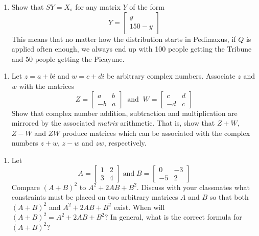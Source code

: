 \begin{enumerate}
\item \label{MClast} Show that $SY = X_{s}$ for any matrix $Y$ of the form \[Y = \left[ \begin{array}{r} y \\ 150 - y \end{array} \right]\] This means that no matter how the distribution starts in Pedimaxus, if $Q$ is applied often enough, we always end up with 100 people getting the Tribune and 50 people getting the Picayune.

\setcounter{HW}{\value{enumi}}
\end{enumerate}

\begin{enumerate}
\setcounter{enumi}{\value{HW}}

\item Let $z = a + bi$ and $w = c + di$ be arbitrary complex numbers.  Associate $z$ and $w$ with the matrices \[Z = \left[ \begin{array}{rr} a & b \\ -b & a \end{array} \right] \;\; \mbox{and} \;\; W = \left[ \begin{array}{rr} c & d \\ -d & c \end{array} \right]\]  Show that complex number addition, subtraction and multiplication are mirrored by the associated \emph{matrix} arithmetic.  That is, show that $Z + W$, $Z - W$ and $ZW$ produce matrices which can be associated with the complex numbers $z + w$, $z - w$ and $zw$, respectively.

\setcounter{HW}{\value{enumi}}
\end{enumerate}

\begin{enumerate}
\setcounter{enumi}{\value{HW}}

\item Let \[A = \left[ \begin{array}{rr} 1 & 2 \\ 3 & 4 \end{array} \right] \; \mbox{and} \; B = \left[ \begin{array}{rr} 0 & -3 \\ -5 & 2 \end{array} \right]\]  Compare $(A + B)^{2}$ to $A^{2} + 2AB + B^{2}$.  Discuss with your classmates what constraints must be placed on two arbitrary matrices $A$ and $B$ so that both $(A + B)^{2}$ and $A^{2} + 2AB + B^{2}$ exist.  When will $(A + B)^{2} = A^{2} + 2AB + B^{2}$?  In general, what is the correct formula for $(A + B)^{2}$?
\setcounter{HW}{\value{enumi}}
\end{enumerate}

